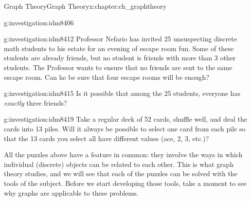 \documentclass[oneside,10pt,]{book}
\numberwithin{equation}{chapter}
\begin{document}
\begin{chapterptx}{Graph Theory}{}{Graph Theory}{}{}{x:chapter:ch_graphtheory}
\begin{introduction}{}
\begin{investigation}{}{g:investigation:idm8406}
\begin{sidebyside}{1}{0}{0}{0}
\begin{sbspanel}{1}
{
}%
\end{sbspanel}%
\end{sidebyside}%
\end{investigation}
\begin{investigation}{}{g:investigation:idm8412}%
Professor Nefario has invited 25 unsuspecting discrete math students to his estate for an evening of escape room fun.  Some of these students are already friends, but no student is friends with more than 3 other students.  The Professor wants to ensure that no friends are sent to the same escape room.  Can he be sure that four escape rooms will be enough?%
\end{investigation}
\begin{investigation}{}{g:investigation:idm8415}%
Is it possible that among the 25 students, everyone has \emph{exactly} three friends?%
\end{investigation}
\begin{investigation}{}{g:investigation:idm8419}%
Take a regular deck of 52 cards, shuffle well, and deal the cards into 13 piles.  Will it always be possible to select one card from each pile so that the 13 cards you select all have different values (ace, 2, 3, etc.)?%
\end{investigation}
All the puzzles above have a feature in common: they involve the ways in which individual (discrete) objects can be related to each other.  This is what graph theory studies, and we will see that each of the puzzles can be solved with the tools of the subject.  Before we start developing those tools, take a moment to see why graphs are applicable to these problems.%

\end{introduction}
\end{chapterptx}
\end{document}
